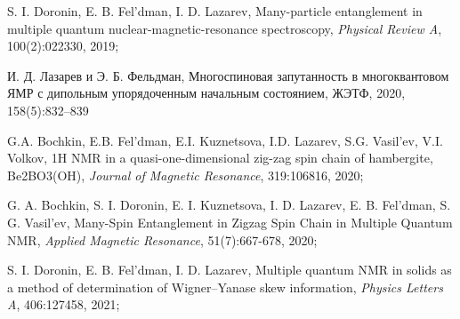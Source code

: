 \item
S. I. Doronin, E. B. Fel'dman,  I. D. Lazarev, Many-particle entanglement in multiple quantum nuclear-magnetic-resonance spectroscopy, \textit{Physical Review A}, 100(2):022330, 2019;


\item И. Д. Лазарев и Э. Б. Фельдман,
Многоспиновая запутанность в многоквантовом ЯМР с дипольным упорядоченным начальным состоянием,
ЖЭТФ, 2020, 158(5):832–839

\item
G.A. Bochkin, E.B. Fel'dman, E.I. Kuznetsova, I.D. Lazarev, S.G. Vasil'ev, V.I. Volkov, 1H NMR in a quasi-one-dimensional zig-zag spin chain of hambergite, Be2BO3(OH), \textit{Journal of Magnetic Resonance}, 319:106816, 2020;

\item
G. A. Bochkin, S. I. Doronin, E. I. Kuznetsova, I. D. Lazarev, E. B. Fel'dman, S. G. Vasil'ev, Many-Spin Entanglement in Zigzag Spin Chain in Multiple Quantum NMR, \textit{Applied Magnetic Resonance}, 51(7):667-678, 2020;

\item
S. I. Doronin, E. B. Fel'dman,  I. D. Lazarev, Multiple quantum NMR in solids as a method of determination of Wigner–Yanase skew information, \textit{Physics Letters A}, 406:127458, 2021;
